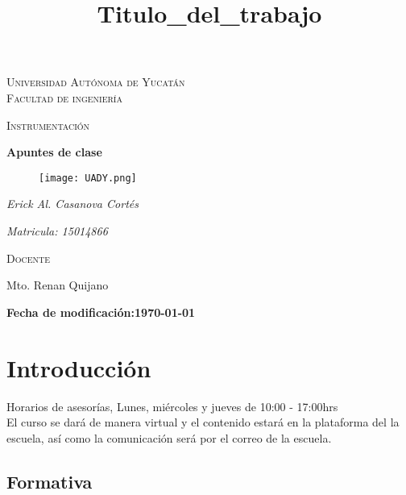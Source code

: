 \documentclass[11pt]{report}
\theoremstyle{plain}
\theoremstyle{definition}
\begin{document}
\begin{titlepage}
\title{Titulo_del_trabajo}


	\centering
	{\scshape\LARGE Universidad Autónoma de Yucatán  \\ Facultad de ingeniería\par}
	\vspace{1cm}
	{\scshape\Large Instrumentación\par}
	\vspace{1.5cm}
	{\huge\bfseries Apuntes de clase\par}
	\vspace{0.7cm}
	{\begin{figure}[!h]
	\centering
    \texttt{[image: UADY.png]}
	\end{figure}}
	\vspace{0.7cm}
	{\Large\itshape Erick Al. Casanova Cortés\par}
	{\Large\itshape Matricula: 15014866 \par}
	\vfill
	{\scshape\Large Docente\par
	Mto. Renan Quijano\par}
	\vfill
	{\Large{\bfseries Fecha de modificación:\today} }

	\vfill
	
\end{titlepage}


\tableofcontents

\chapter{Introducción}

Horarios de asesorías, Lunes, miércoles y jueves de 10:00 - 17:00hrs \\

El curso se dará de manera virtual y el contenido estará en la plataforma del la escuela, así como la comunicación será por el correo de la escuela.\\

\section{Formativa}
\end{document}
